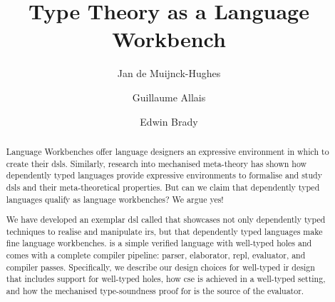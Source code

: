 \documentclass[%
final,%
a4paper,
UKenglish,
cleveref,
autoref,
thm-restate,
pdfa
]{oasics-v2021}
\title{Type Theory as a Language Workbench} %
\author
{Jan {de Muijnck-Hughes}}
{University of Glasgow, UK}
{Jan.deMuijnck-Hughes@glasgow.ac.uk}
{https://orcid.org/0000-0003-2185-8543}
{Funded by EPSRC grants: Border Patrol (EP/N028201/1) and AppControl (EP/V000462/1).} %
\author
{Guillaume Allais}
{University of St Andrews, UK}
{gxa1@st-andrews.ac.uk} %
{https://orcid.org/0000-0002-4091-657X} %
{} %
\author
{Edwin Brady}
{University of St Andrews, UK}
{ecb10@st-andrews.ac.uk} %
{https://orcid.org/0000-0002-9734-367X} %
{} %
\begin{document}
%

\maketitle


\begin{abstract}
  Language Workbenches offer language designers an expressive environment in which to create their \acp*{dsl}.
  Similarly, research into mechanised meta-theory has shown how dependently typed languages provide expressive environments to formalise and study \acsp*{dsl} and their meta-theoretical properties.
  But can we claim that dependently typed languages qualify as language workbenches?
  We argue yes!


  We have developed an exemplar \acs*{dsl} called \Velo{} that showcases not only dependently typed techniques to realise and manipulate \acp*{ir}, but that dependently typed languages make fine language workbenches.
  \Velo{} is a simple verified language with well-typed holes and comes with a complete compiler pipeline: parser, elaborator, \acs*{repl}, evaluator, and compiler passes.
  Specifically, we describe our design choices for well-typed \acs*{ir} design that includes support for well-typed holes, how \acf*{cse} is achieved in a well-typed setting, and how the mechanised type-soundness proof for \Velo{} is the source of the evaluator.
\end{abstract}


%
%
%
%
\end{document}
